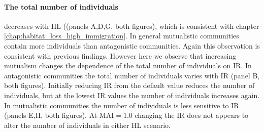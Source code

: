 \paragraph*{The total number of individuals} decreases with HL ((panels A,D,G, both figures), which is consistent with chapter \ref{chap:habitat_loss_high_immigration}. In general mutualistic communities contain more individuals than antagonistic communities. Again this observation is consistent with previous findings. However here we observe that increasing mutualism changes the dependence of the total number of individuals on IR. In antagonistic communities the total number of individuals varies with IR (panel B, both figures). Initially reducing IR from the default value reduces the number of individuals, but at the lowest IR values the number of individuals increases again. In mutualistic communities the number of individuals is less sensitive to IR (panels E,H, both figures). At MAI$ =1.0$ changing the IR does not appears to alter the number of individuals in either HL scenario.

